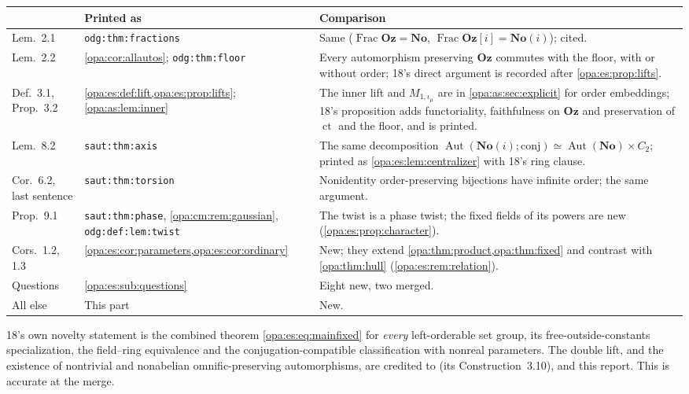 \documentclass[11pt,oneside]{article}
\numberwithin{equation}{section}
\theoremstyle{definition}
\theoremstyle{remark}
\newcommand{\No}{\mathbf{No}}
\newcommand{\Oz}{\mathbf{Oz}}
\newcommand{\Og}{\mathbf{Oz}[i]}
\newcommand{\SC}{\mathbf{No}(i)}
\newcommand{\Aut}{\operatorname{Aut}}
\newcommand{\ct}{\operatorname{ct}}
\newcommand{\Frac}{\operatorname{Frac}}
\newcommand{\lbl}[1]{\nolinkurl{#1}}
\begin{document}
\begin{center}
\renewcommand{\arraystretch}{1.15}
\begin{longtable}{>{\raggedright\arraybackslash}p{}>{\raggedright\arraybackslash}p{}>{\raggedright\arraybackslash}p{}}
\toprule
18 & Printed as & Comparison\\
\midrule
\endhead
Lem.~2.1 & \lbl{odg:thm:fractions} & Same ($\Frac\Oz=\No$, $\Frac\Og=\SC$); cited.\\
Lem.~2.2 & \cref{opa:cor:allautos}; \lbl{odg:thm:floor} & Every automorphism preserving $\Oz$ commutes with the floor, with
or without order; 18's direct argument is recorded after \cref{opa:es:prop:lifts}.\\
Def.~3.1, Prop.~3.2 & \cref{opa:es:def:lift,opa:es:prop:lifts}; \cref{opa:as:lem:inner} & The inner lift and $M_{1,\iota_\mu}$
are in \cref{opa:as:sec:explicit} for order embeddings; 18's proposition adds functoriality, faithfulness on $\Oz$ and preservation
of $\ct$ and the floor, and is printed.\\
Lem.~8.2 & \lbl{saut:thm:axis} & The same decomposition $\Aut(\SC;\text{conj})\simeq\Aut(\No)\times C_2$; printed as
\cref{opa:es:lem:centralizer} with 18's ring clause.\\
Cor.~6.2, last sentence & \lbl{saut:thm:torsion} & Nonidentity order-preserving bijections have infinite order; the same
argument.\\
Prop.~9.1 & \lbl{saut:thm:phase}, \cref{opa:cm:rem:gaussian}, \lbl{odg:def:lem:twist} & The twist is a phase twist; the fixed
fields of its powers are new (\cref{opa:es:prop:character}).\\
Cors.~1.2, 1.3 & \cref{opa:es:cor:parameters,opa:es:cor:ordinary} & New; they extend \cref{opa:thm:product,opa:thm:fixed} and
contrast with \cref{opa:thm:hull} (\cref{opa:es:rem:relation}).\\
Questions & \cref{opa:es:sub:questions} & Eight new, two merged.\\
All else & This part & New.\\
\bottomrule
\end{longtable}
\end{center}

18's own novelty statement is the combined theorem \eqref{opa:es:eq:mainfixed} for \emph{every} left-orderable set group, its
free-outside-constants specialization, the field--ring equivalence and the conjugation-compatible classification with nonreal
parameters. The double lift, and the existence of nontrivial and nonabelian omnific-preserving automorphisms, are credited to
\cite{KKS} (its Construction~3.10), \cite{KS} and this report. This is accurate at the merge.
\end{document}
